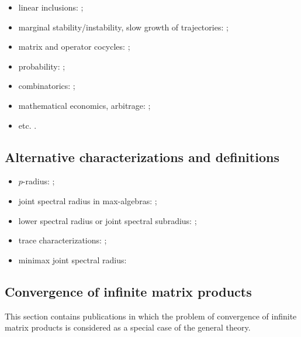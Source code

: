 \begin{itemize}
\item linear inclusions: \cite{ABMW:MTNS12, AJPR:IFACSRCD12, Bar:AIT88-3:e, Bar:AIT88-2:e, Bar:AIT88-5:e, Bar:ACC95, BarVin:LAA11, CheMam:BASRM04, DaiOp:AIT01:e, DHHX:JFI17, GurSam:CDC05, Gurv:LAA95, VEB:LAA00, Wirth:IJRNC98};
\item marginal stability/instability, slow growth of trajectories: \cite{Sun:IEEETAC08, CMS:SCL12, PhilJung:ICHS15, PJ:NAHS15, Prot:SCL16, Morris:SCL22};
\item matrix and operator cocycles: \cite{BD:ArXiv18, DHX:ArXiv13-1, Morris:JFA12};
\item probability: \cite{ADFP:93, AltPar:CDC19, AltPar:SIAMJCO20, DHH:ArXiv14, KKV:CESA98, Li:IEEETAC11, Sert:CRMASP17};
\item combinatorics: \cite{BJ:CANT10, JPB:TCM09, MOS:GTS99, MOS:IEEETIT01, MOS:LAA07, Prot:SM00};
\item mathematical economics, arbitrage: \cite{CrossKPP:MECA12, CrossKoz:DCDSB13, KozCalPok:ArXiv10};
\item etc. \cite{BCK:AIP16, JPB:LNCS08, NP:SIAMJMAA20, Oreg-Reyes:GGD18, TO:ArXiv09, VladRub:JCA01}.
\end{itemize}

\subsection*{Alternative characterizations and definitions}
\begin{itemize}
\item $p$-radius: \cite{BhaBha:SM95, JP:CDC10, JunProt:SIAMJSC11, Morris:ArXiv19, OgurJung:CDC14, OgurMart:LAA14, OPJ:SCL16, Prot:LAA08, Prot:CDC05-2, Muller:APM97, Morris:AM16};
\item joint spectral radius in max-algebras: \cite{Bapat:LAA98, BGT:IEEETAC00, DGM:LIPICS17, Gaubert:IEEETAC95, GMW:LAA17, GurMas:LAA11, Lur:LAA05, Lur:LAA06-1, LurYang:LAA09, MulPep:LAA13, Pep:LAA08, Pep:LAA11};
\item lower spectral radius or joint spectral subradius: \cite{BochiMor:PLMS15, CJ:IJAMCS06, CJ:IJAMCS07, Czornik:LAA05, DekKui:JEMS11, JPB:TCM09, Jungers:LAA12};
\item trace characterizations: \cite{ChenZhou:LAA00, Xu:EJLA10};
\item minimax joint spectral radius: \cite{Koz:DCDSB19}
\end{itemize}

\subsection*{Convergence of infinite matrix products}
This section contains publications in which the problem of convergence of infinite matrix products is considered as a special case of the general theory.

